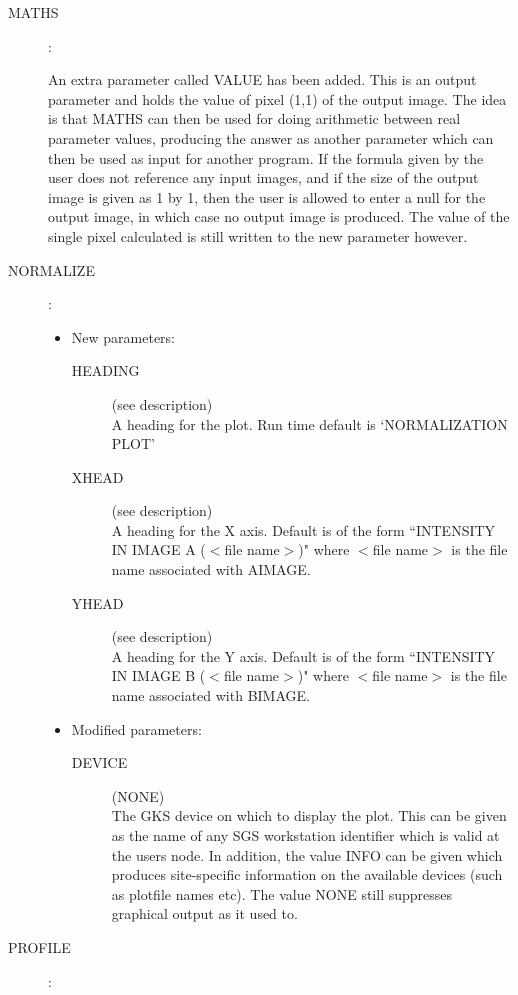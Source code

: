 \begin{description}
\item [MATHS]:

An extra parameter called VALUE has been added.
This is an output parameter and holds the value of pixel (1,1) of the output
image.
The idea is that MATHS can then be used for doing arithmetic between real
parameter values, producing the answer as another parameter which can then be
used as input for another program.
If the formula given by the user does not reference any input images, and if
the size of the output image is given as 1 by 1, then the user is allowed to
enter a null for the output image, in which case no output image is produced.
The value of the single pixel calculated is still written to the new parameter
however.

\item [NORMALIZE]:

\begin{itemize}
\item New parameters:
\begin{description}
\item [HEADING](see description)\\
 A heading for the plot.
 Run time default is `NORMALIZATION PLOT'
\item [XHEAD](see description)\\
 A heading for the X axis.
 Default is of the form ``INTENSITY IN IMAGE A ($<$file name$>$)" where
 $<$file name$>$ is the file name associated with AIMAGE.
\item [YHEAD](see description)\\
 A heading for the Y axis.
 Default is of the form ``INTENSITY IN IMAGE B ($<$file name$>$)" where
 $<$file name$>$ is the file name associated with BIMAGE.
\end{description}
\item Modified parameters:
\begin{description}
\item [DEVICE](NONE)\\
 The GKS device on which to display the plot.
 This can be given as the name of any SGS workstation identifier which is valid
 at the users node.
 In addition, the value INFO can be given which produces site-specific
 information on the available devices (such as plotfile names etc).
 The value NONE still suppresses graphical output as it used to.
\end{description}
\end{itemize}

\item [PROFILE]:


\end{description}
